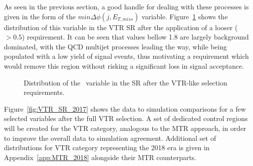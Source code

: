 \hspace{10pt} As seen in the previous section, a good handle for dealing with these processes is given in the form of the $min\Delta\phi(j, E_{T,miss})$ variable. Figure~\ref{fig:VTR_mindphi} shows the distribution of this variable in the VTR SR after the application of a looser ($>0.5$) requirement. It can be seen that values bellow 1.8 are largely background dominated, with the QCD multijet processes leading the way, while being populated with a low yield of signal events, thus motivating a requirement which would remove this region without risking a significant loss in signal acceptance. 

\begin{figure}[htbp]
  \centering
  \caption{Distribution of the \mindphi~variable in the SR after the VTR-like selection requirements.}
  \label{fig:VTR_mindphi}
\end{figure}
Figure~\ref{fig:VTR_SR_2017} shows the data to simulation comparisons for a few selected variables after the full VTR selection. A set of dedicated control regions will be created for the VTR category, analogous to the MTR approach, in order to improve the overall data to simulation agreement. Additional set of distributions for VTR category representing the 2018 era is given in Appendix~\ref{app:MTR_2018} alongside their MTR counterparts. 



